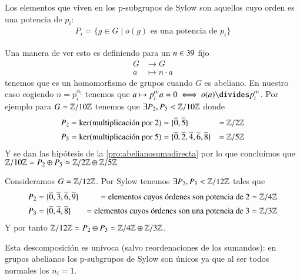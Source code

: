 \begin{obs}
	Los elementos que viven en los p-subgrupos de Sylow son aquellos cuyo orden es una potencia de $p_i$:
	\begin{align*}
		P_i = \{g\in G \mid o(g)\text{ es una potencia de } p_i\}
	\end{align*}
\end{obs}

\begin{ej}
	Una manera de ver esto es definiendo para un $n \in 39$ fijo
	\begin{align*}
		G &\to G \\
		a &\mapsto n\cdot a
	\end{align*}
	tenemos que es un homomorfismo de grupos cuando $G$ es abeliano. En nuestro caso cogiendo $n = p_i^{\alpha_i}$ tenemos que $a \mapsto p_i^{\alpha_i} a = 0 \iff o(a) \divides p_i^{\alpha_i}$. Por ejemplo para $G = \mathbb{Z}/10\mathbb{Z}$ tenemos que $\exists P_2, P_5 < \mathbb{Z}/10\mathbb{Z}$ donde
	\begin{align*}
		P_2 &= \ker(\text{multiplicación por 2}) = \{\overline{0}, \overline{5}\} &\simeq \mathbb{Z}/2\mathbb{Z} \\
		P_5 &= \ker(\text{multiplicación por 5}) = \{\overline{0}, \overline{2}, \overline{4}, \overline{6}, \overline{8}\} &\simeq \mathbb{Z}/5\mathbb{Z}
	\end{align*}
	Y se dan las hipótesis de la \autoref{pro:abelianosumadirecta} por lo que concluímos que $\mathbb{Z}/10\mathbb{Z} = P_2 \oplus P_5 \simeq \mathbb{Z}/2\mathbb{Z} \oplus \mathbb{Z}/5\mathbb{Z}$
\end{ej}

\begin{ej}
	Consideramos $G = \mathbb{Z}/12\mathbb{Z}$. Por Sylow tenemos $\exists P_2, P_3 < \mathbb{Z}/12\mathbb{Z}$ tales que
	\begin{align*}
		P_2 &= \{\overline{0}, \overline{3}, \overline{6}, \overline{9}\} &= \text{elementos cuyos órdenes son potencia de } 2 &\simeq \mathbb{Z}/4\mathbb{Z}\\
		P_3 &= \{\overline{0}, \overline{4}, \overline{8}\} &= \text{elementos cuyos órdenes son una potencia de } 3 &\simeq \mathbb{Z}/3\mathbb{Z}
	\end{align*}
	Y por tanto $\mathbb{Z}/12\mathbb{Z} \simeq P_2 \oplus P_3 \simeq \mathbb{Z}/4\mathbb{Z} \oplus \mathbb{Z}/3\mathbb{Z}$.
\end{ej}

\begin{obs}
	Esta descomposición es unívoca (salvo reordenaciones de los sumandos): en grupos abelianos los p-subgrupos de Sylow son únicos ya que al ser todos normales los $n_i = 1$.
\end{obs}

